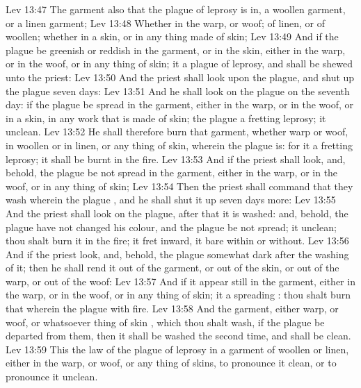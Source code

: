 \vs Lev 13:47 The garment also that the plague of leprosy is in,  a woollen garment, or a linen garment;
\vs Lev 13:48 Whether  in the warp, or woof; of linen, or of woollen; whether in a skin, or in any thing made of skin;
\vs Lev 13:49 And if the plague be greenish or reddish in the garment, or in the skin, either in the warp, or in the woof, or in any thing of skin; it  a plague of leprosy, and shall be shewed unto the priest:
\vs Lev 13:50 And the priest shall look upon the plague, and shut up  the plague seven days:
\vs Lev 13:51 And he shall look on the plague on the seventh day: if the plague be spread in the garment, either in the warp, or in the woof, or in a skin,  in any work that is made of skin; the plague  a fretting leprosy; it  unclean.
\vs Lev 13:52 He shall therefore burn that garment, whether warp or woof, in woollen or in linen, or any thing of skin, wherein the plague is: for it  a fretting leprosy; it shall be burnt in the fire.
\vs Lev 13:53 And if the priest shall look, and, behold, the plague be not spread in the garment, either in the warp, or in the woof, or in any thing of skin;
\vs Lev 13:54 Then the priest shall command that they wash  wherein the plague , and he shall shut it up seven days more:
\vs Lev 13:55 And the priest shall look on the plague, after that it is washed: and, behold,  the plague have not changed his colour, and the plague be not spread; it  unclean; thou shalt burn it in the fire; it  fret inward,  it  bare within or without.
\vs Lev 13:56 And if the priest look, and, behold, the plague  somewhat dark after the washing of it; then he shall rend it out of the garment, or out of the skin, or out of the warp, or out of the woof:
\vs Lev 13:57 And if it appear still in the garment, either in the warp, or in the woof, or in any thing of skin; it  a spreading : thou shalt burn that wherein the plague  with fire.
\vs Lev 13:58 And the garment, either warp, or woof, or whatsoever thing of skin , which thou shalt wash, if the plague be departed from them, then it shall be washed the second time, and shall be clean.
\vs Lev 13:59 This  the law of the plague of leprosy in a garment of woollen or linen, either in the warp, or woof, or any thing of skins, to pronounce it clean, or to pronounce it unclean.
